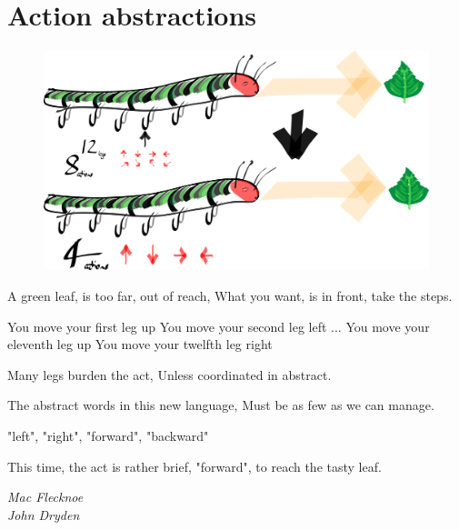 \section{Action abstractions}

\begin{figure}
\centering
\includegraphics[width=\textwidth,height=0.5\textheight]{../../pictures/drawings/caterpillar.png}
\caption{}
\end{figure}


\epigraph{
A green leaf, is too far, out of reach,
What you want, is in front, take the steps.

You move your first leg up You move your second leg left ... You move your eleventh leg up You move your twelfth leg right

Many legs burden the act,
Unless coordinated in abstract.

The abstract words in this new language,
Must be as few as we can manage.

"left", "right", "forward", "backward"

This time, the act is rather brief,
"forward", to reach the tasty leaf.
}{\textit{Mac Flecknoe \\ John Dryden}}
